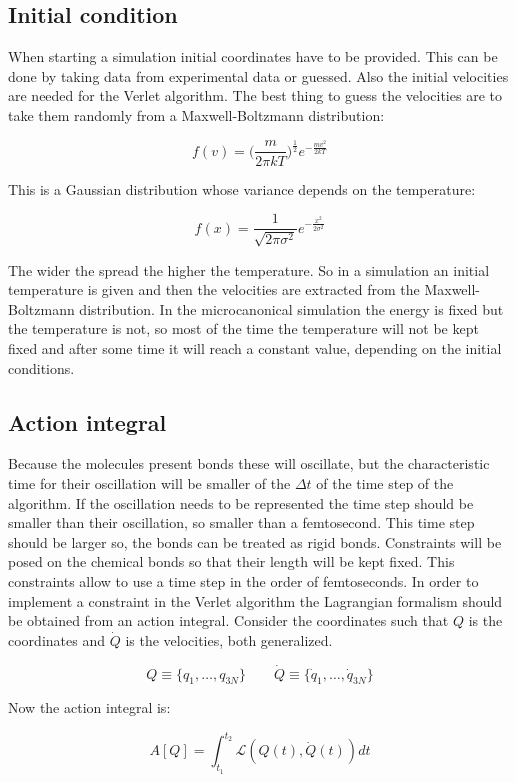 	\subsection{Initial condition}
	When starting a simulation initial coordinates have to be provided.
	This can be done by taking data from experimental data or guessed.
	Also the initial velocities are needed for the Verlet algorithm.
	The best thing to guess the velocities are to take them randomly from a Maxwell-Boltzmann distribution:

	$$f(v) = \biggl(\frac{m}{2\pi kT}\biggr)^\frac{1}{2}e^{-\frac{mv^2}{2kT}}$$

	This is a Gaussian distribution whose variance depends on the temperature:

	$$f(x) = \frac{1}{\sqrt{2\pi\sigma^2}}e^{-\frac{x^2}{2\sigma^2}}$$

	The wider the spread the higher the temperature.
	So in a simulation an initial temperature is given and then the velocities are extracted from the Maxwell-Boltzmann distribution.
	In the microcanonical simulation the energy is fixed but the temperature is not, so most of the time the temperature will not be kept fixed and after some time it will reach a constant value, depending on the initial conditions.

	\subsection{Action integral}
	Because the molecules present bonds these will oscillate, but the characteristic time for their oscillation will be smaller of the $\Delta t$ of the time step of the algorithm.
	If the oscillation needs to be represented the time step should be smaller than their oscillation, so smaller than a femtosecond.
	This time step should be larger so, the bonds can be treated as rigid bonds.
	Constraints will be posed on the chemical bonds so that their length will be kept fixed.
	This constraints allow to use a time step in the order of femtoseconds.
	In order to implement a constraint in the Verlet algorithm the Lagrangian formalism should be obtained from an action integral.
	Consider the coordinates such that $Q$ is the coordinates and $\dot{Q}$ is the velocities, both generalized.

	$$Q \equiv\{q_1, \dots, q_{3N}\}\qquad \dot{Q}\equiv\{\dot{q}_1, \dots, \dot{q}_{3N}\}$$

	Now the action integral is:

	$$A[Q] = \int_{t_1}^{t_2}\mathcal{L}(Q(t), \dot{Q}(t))dt$$

